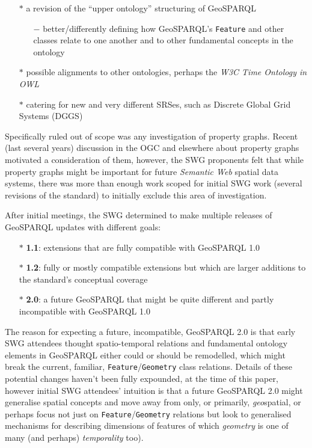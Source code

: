 \documentclass[runningheads]{llncs}
\begin{document}
\begin{itemize}
    \item[$\ast$] a revision of the ``upper  ontology'' structuring of GeoSPARQL
    \begin{itemize}
        \item[$-$] better/differently defining how GeoSPARQL's \texttt{Feature} and other classes relate to one another and to other fundamental concepts in the ontology
    \end{itemize} 
    \item[$\ast$] possible alignments to other ontologies, perhaps the \textit{W3C Time Ontology in OWL}\cite{simon_cox_time_2017}
    \item[$\ast$] catering for new and very different SRSes, such as Discrete Global Grid Systems (DGGS) 
\end{itemize}

Specifically ruled out of scope was any investigation of property graphs. Recent (last several years) discussion in the OGC and 
elsewhere about property graphs motivated a consideration of them, however, the SWG proponents felt that while property graphs might 
be important for future \textit{Semantic Web} spatial data systems, there was more than enough work scoped for initial SWG work
(several revisions of the standard) to initially exclude this area of investigation.

After initial meetings, the SWG determined to make multiple releases of GeoSPARQL updates with different goals:

\begin{itemize}
    \item[$\ast$] \textbf{1.1}: extensions that are fully compatible with GeoSPARQL 1.0
    \item[$\ast$] \textbf{1.2}: fully or mostly compatible extensions but which are larger additions to the standard's conceptual coverage
    \item[$\ast$] \textbf{2.0}: a future GeoSPARQL that might be quite different and partly incompatible with GeoSPARQL 1.0
\end{itemize} 

The reason for expecting a future, incompatible, GeoSPARQL 2.0 is that early SWG attendees thought spatio-temporal relations
and fundamental ontology elements in GeoSPARQL either could or should be remodelled, which might break the current, familiar, 
\texttt{Feature}/\texttt{Geometry} class relations. Details of these potential changes haven't been fully expounded, at the 
time of this paper, however initial SWG attendees' intuition is that a future GeoSPARQL 2.0 might generalise spatial concepts and
move away from only, or primarily, \textit{geo}spatial, or perhaps focus not just on \texttt{Feature}/\texttt{Geometry} relations
but look to generalised mechanisms for describing dimensions of features of which \textit{geometry} is one of many (and perhaps)
\textit{temporality} too).
\end{document}
